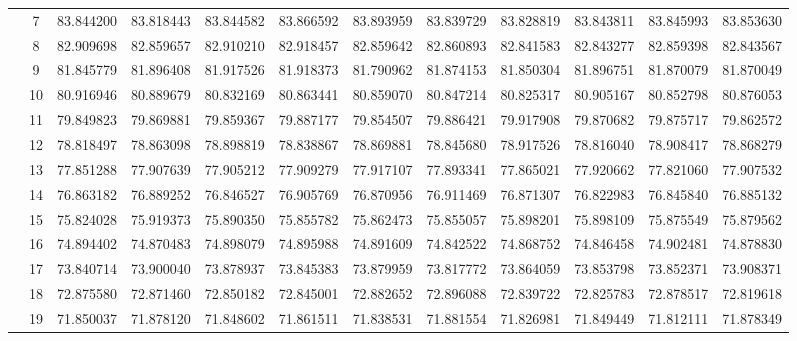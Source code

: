 \begin{table}[h]
{\begin{tabular}{cc|cccccccccc}
\multicolumn{1}{|c|}{} & 7 & 83.844200 & 83.818443 & 83.844582 & 83.866592 & 83.893959 & 83.839729 & 83.828819 & 83.843811 & 83.845993 & 83.853630 \\ \cline{2-2}
\multicolumn{1}{|c|}{} & 8 & 82.909698 & 82.859657 & 82.910210 & 82.918457 & 82.859642 & 82.860893 & 82.841583 & 82.843277 & 82.859398 & 82.843567 \\ \cline{2-2}
\multicolumn{1}{|c|}{} & 9 & 81.845779 & 81.896408 & 81.917526 & 81.918373 & 81.790962 & 81.874153 & 81.850304 & 81.896751 & 81.870079 & 81.870049 \\ \cline{2-2}
\multicolumn{1}{|c|}{} & 10 & 80.916946 & 80.889679 & 80.832169 & 80.863441 & 80.859070 & 80.847214 & 80.825317 & 80.905167 & 80.852798 & 80.876053 \\ \cline{2-2}
\multicolumn{1}{|c|}{} & 11 & 79.849823 & 79.869881 & 79.859367 & 79.887177 & 79.854507 & 79.886421 & 79.917908 & 79.870682 & 79.875717 & 79.862572 \\ \cline{2-2}
\multicolumn{1}{|c|}{} & 12 & 78.818497 & 78.863098 & 78.898819 & 78.838867 & 78.869881 & 78.845680 & 78.917526 & 78.816040 & 78.908417 & 78.868279 \\ \cline{2-2}
\multicolumn{1}{|c|}{} & 13 & 77.851288 & 77.907639 & 77.905212 & 77.909279 & 77.917107 & 77.893341 & 77.865021 & 77.920662 & 77.821060 & 77.907532 \\ \cline{2-2}
\multicolumn{1}{|c|}{} & 14 & 76.863182 & 76.889252 & 76.846527 & 76.905769 & 76.870956 & 76.911469 & 76.871307 & 76.822983 & 76.845840 & 76.885132 \\ \cline{2-2}
\multicolumn{1}{|c|}{} & 15 & 75.824028 & 75.919373 & 75.890350 & 75.855782 & 75.862473 & 75.855057 & 75.898201 & 75.898109 & 75.875549 & 75.879562 \\ \cline{2-2}
\multicolumn{1}{|c|}{} & 16 & 74.894402 & 74.870483 & 74.898079 & 74.895988 & 74.891609 & 74.842522 & 74.868752 & 74.846458 & 74.902481 & 74.878830 \\ \cline{2-2}
\multicolumn{1}{|c|}{} & 17 & 73.840714 & 73.900040 & 73.878937 & 73.845383 & 73.879959 & 73.817772 & 73.864059 & 73.853798 & 73.852371 & 73.908371 \\ \cline{2-2}
\multicolumn{1}{|c|}{} & 18 & 72.875580 & 72.871460 & 72.850182 & 72.845001 & 72.882652 & 72.896088 & 72.839722 & 72.825783 & 72.878517 & 72.819618 \\ \cline{2-2}
\multicolumn{1}{|c|}{} & 19 & 71.850037 & 71.878120 & 71.848602 & 71.861511 & 71.838531 & 71.881554 & 71.826981 & 71.849449 & 71.812111 & 71.878349 \\ \cline{2-2}

\end{tabular}}
\end{table}
